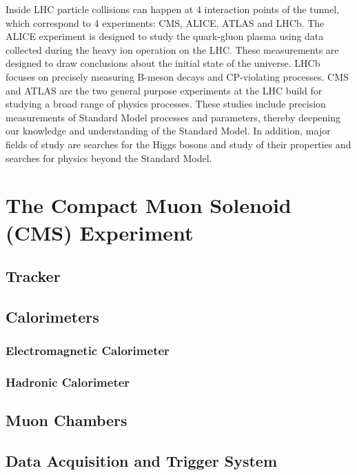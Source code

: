 \vspace{0.3cm}
Inside LHC particle collisions can happen at 4 interaction points of the tunnel, which correspond to 4 experiments: CMS, ALICE, ATLAS and LHCb. The ALICE experiment is designed to study the quark-gluon plasma using data collected during the heavy ion operation on the LHC. These measurements are designed to draw conclusions about the initial state of the universe. LHCb focuses on precisely measuring B-meson decays and CP-violating processes. CMS and ATLAS are the two general purpose experiments at the LHC build for studying a broad range of physics processes. These studies include precision measurements of Standard Model processes and parameters, thereby deepening our knowledge and understanding of the Standard Model. In addition, major fields of study are searches for the Higgs bosons and study of their properties and searches for physics beyond the Standard Model.

\section{The Compact Muon Solenoid (CMS) Experiment}

\subsection{Tracker} 
\subsection{Calorimeters} 
\subsubsection{Electromagnetic Calorimeter} 
\subsubsection{Hadronic Calorimeter} 
\subsection{Muon Chambers} 
\subsection{Data Acquisition and Trigger System} 

